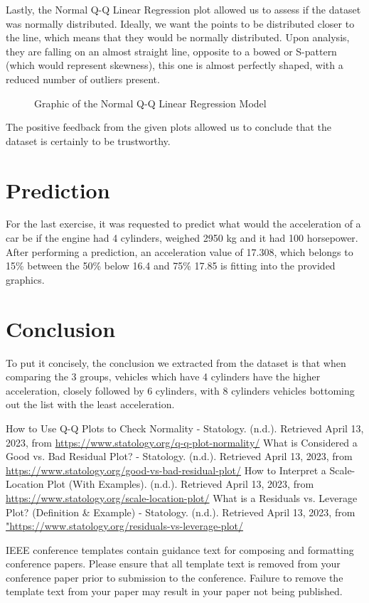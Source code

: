 \documentclass[conference]{IEEEtran}
\begin{document}
Lastly, the Normal Q-Q Linear Regression plot allowed us to assess if the dataset was normally distributed.
Ideally, we want the points to be distributed closer to the line, which means that they would be normally distributed. 
Upon analysis, they are falling on an almost straight line, opposite to a bowed or S-pattern (which would represent skewness), this one is almost perfectly shaped, 
with a reduced number of outliers present.

\begin{figure}[htbp]
    \caption{Graphic of the Normal Q-Q Linear Regression Model}
    \label{normalQQ}
\end{figure}

The positive feedback from the given plots allowed us to conclude that the dataset is certainly to be trustworthy.

\section{Prediction}

For the last exercise, it was requested to predict what would the acceleration of a car be if the engine had 4 cylinders, weighed 2950 kg and it had 100 horsepower. 
After performing a prediction, an acceleration value of 17.308, which belongs to 15\% 
between the 50\% below 16.4 and 75\% 17.85 is fitting into the provided graphics.

\section{Conclusion}

To put it concisely, the conclusion we extracted from the dataset is that when comparing the 3 groups, vehicles which have 4 cylinders have the higher acceleration, 
closely followed by 6 cylinders, with 8 cylinders vehicles bottoming out the list with the least acceleration.


\begin{thebibliography}{00}
 How to Use Q-Q Plots to Check Normality - Statology. (n.d.). Retrieved April 13, 2023, from \url{https://www.statology.org/q-q-plot-normality/}
 What is Considered a Good vs. Bad Residual Plot? - Statology. (n.d.). Retrieved April 13, 2023, from \url{https://www.statology.org/good-vs-bad-residual-plot/}
 How to Interpret a Scale-Location Plot (With Examples). (n.d.). Retrieved April 13, 2023, from \url{https://www.statology.org/scale-location-plot/}
 What is a Residuals vs. Leverage Plot? (Definition \& Example) - Statology. (n.d.). Retrieved April 13, 2023, from \url{"https://www.statology.org/residuals-vs-leverage-plot/}
\end{thebibliography}
\vspace{12pt}
\color{red}
IEEE conference templates contain guidance text for composing and formatting conference papers. Please ensure that all template text is removed from your conference paper prior to submission to the conference. Failure to remove the template text from your paper may result in your paper not being published.
\end{document}
